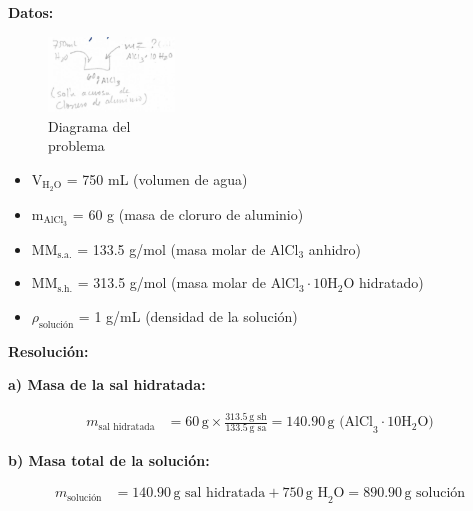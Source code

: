 \documentclass{article}
\begin{document}

\noindent\textbf{Datos:} %

\begin{figure}[H]
    \begin{minipage}[t]{0.3\textwidth} %
        \raggedright %
        \includegraphics[width=\linewidth, height=2cm]{./problema5_diagrama.png} %
        \caption{Diagrama del \\ problema}
    \end{minipage}
\end{figure}

\begin{itemize}
\item V$_{\text{H}_2\text{O}}$ = 750 mL (volumen de agua)
\item m$_{\text{AlCl}_3}$ = 60 g (masa de cloruro de aluminio)
\item MM$_{\text{s.a.}}$ = 133.5 g/mol (masa molar de AlCl$_3$ anhidro)
\item MM$_{\text{s.h.}}$ = 313.5 g/mol (masa molar de AlCl$_3\cdot10\text{H}_2\text{O}$ hidratado)
\item $\rho_{\text{solución}}$ = 1 g/mL (densidad de la solución)
\end{itemize}


\noindent\textbf{Resolución:} %

\textbf{a) Masa de la sal hidratada:}

\begin{align*}
    m_{\text{sal hidratada}} &= 60 \, \text{g} \times \frac{313.5 \, \text{g sh}}{133.5 \, \text{g sa}} = 140.90 \, \text{g (AlCl}_3 \cdot 10\text{H}_2\text{O)}
\end{align*}

\textbf{b) Masa total de la solución:}

\begin{align*}
    m_{\text{solución}} &= 140.90 \, \text{g sal hidratada} + 750 \, \text{g H}_2\text{O} = 890.90 \, \text{g solución}
\end{align*}
\end{document}
